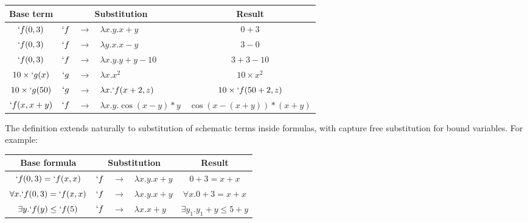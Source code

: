 \begin{ex}
  \begin{center}
    \begin{tabular}{|c|r c l|c|}
      \noalign{\vspace{0.5em}}
      \hline
      Base term            & \multicolumn{3}{c|}{Substitution} & Result                                                                 \\
      \hline
      $`f(0, 3)$           & $`f$                              & $\rightarrow$ & $\lambda x.y. x+y$         & $0+3$                     \\
      $`f(0, 3)$           & $`f$                              & $\rightarrow$ & $\lambda y.x. x-y$         & $3-0$                     \\
      $`f(0, 3)$           & $`f$                              & $\rightarrow$ & $\lambda x.y. y+y-10$      & $3+3-10$                  \\
      $10 \times {`g(x)}$  & $`g$                              & $\rightarrow$ & $\lambda x. x^2$           & $10 \times x^2$           \\
      $10 \times {`g(50)}$ & $`g$                              & $\rightarrow$ & $\lambda x. `f(x+2, z)$    & $10 \times {`f(50+2, z)}$ \\
      $`f(x, x+y)$         & $`f$                              & $\rightarrow$ & $\lambda x.y. \cos(x-y)*y$ & $\cos(x-(x+y))*(x+y)$     \\
      \hline
    \end{tabular}
  \end{center}
\end{ex}


The definition extends naturally to substitution of schematic terms inside formulas, with capture free substitution for bound variables. For example:

\begin{ex}
  \begin{center}
    \begin{tabular}{|c|r c l|c|}
      \noalign{\vspace{0.5em}}
      \hline
      Base formula                     & \multicolumn{3}{c|}{Substitution} & Result                                                             \\
      \hline
      $`f(0, 3) = `f(x, x)$            & $`f$                              & $\rightarrow$ & $\lambda x.y. x+y$ & $0+3 = x+x$                   \\
      $\forall x. `f(0, 3) = `f(x, x)$ & $`f$                              & $\rightarrow$ & $\lambda x.y. x+y$ & $\forall x. 0+3 = x+x$        \\

      $\exists y. `f(y) \leq `f(5)$    & $`f$                              & $\rightarrow$ & $\lambda x. x+y$   & $\exists y_1. y_1+y \leq 5+y$ \\

      \hline
    \end{tabular}
  \end{center}
\end{ex}

